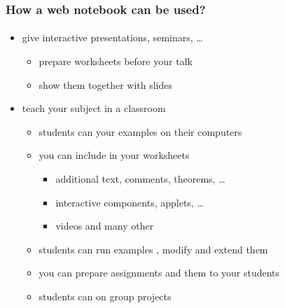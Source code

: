 \documentclass{beamer}
\begin{document}
\begin{frame}
    \frametitle{How a web notebook can be used?}
    \framesubtitle{}

    \begin{itemize}
        \item give interactive presentations, seminars, \ldots
            \begin{itemize}
                \pause
                \item prepare worksheets before your talk
                \pause
                \item show them together with slides
            \end{itemize}
        \pause
        \item teach your subject in a classroom
            \begin{itemize}
                \pause
                \item students can  your examples on their computers
                \pause
                \item you can include  in your worksheets
                    \begin{itemize}
                        \pause
                        \item additional text, comments, theorems, \ldots
                        \pause
                        \item interactive components, applets, \ldots
                        \pause
                        \item videos and many other
                    \end{itemize}
                \pause
                \item students can run examples , modify and extend them
                \pause
                \item you can prepare assignments and  them to your students
                \pause
                \item students can  on group projects
            \end{itemize}
    \end{itemize}
\end{frame}
\end{document}
